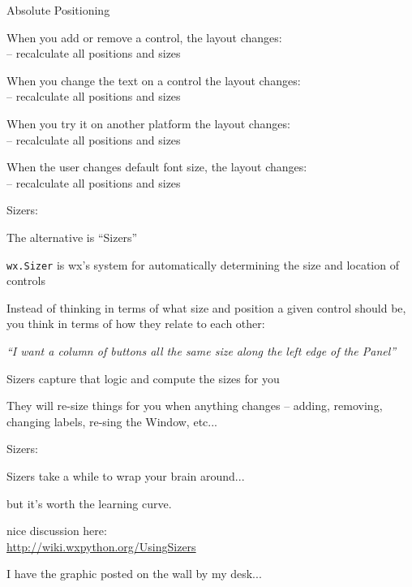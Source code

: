 \documentclass{beamer}
\begin{document}
\begin{frame}[fragile]{Absolute Positioning}

{\Large When you add or remove a control, the layout changes:}\\
{\large -- recalculate all positions and sizes}

\vfill
{\Large When you change the text  on a control the layout changes:}\\
{\large -- recalculate all positions and sizes}

\vfill
{\Large When you try it on another platform the layout changes:}\\
{\large -- recalculate all positions and sizes}

\vfill
{\Large When the user changes default font size, the layout changes:}\\
{\large -- recalculate all positions and sizes}

\end{frame}

\begin{frame}[fragile]{Sizers:}

{\Large The alternative is ``Sizers''}

\vfill
{\large \verb`wx.Sizer` is wx's system for automatically determining the size and location of controls}

\vfill
{\large Instead of thinking in terms of what size and position a given control should be, you think in terms of how they relate to each other:}

\vfill
{\large \emph{``I want a column of buttons all the same size along the left edge of the Panel''} }

\vfill
{\large Sizers capture that logic and compute the sizes for you}

\vfill
{\large They will re-size things for you when anything changes -- adding, removing, changing labels, re-sing the Window, etc...}

\end{frame}


\begin{frame}[fragile]{Sizers:}

{\Large Sizers take a while to wrap your brain around...}

\vfill
{\large but it's worth the learning curve.}


\vfill
{\large nice discussion here:\\
\url{http://wiki.wxpython.org/UsingSizers} }

\vfill
{I have the graphic posted on the wall by my desk...}

\end{frame}
\end{document}
